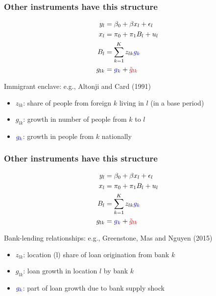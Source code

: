 \documentclass[notes,11pt, aspectratio=169]{beamer}
\begin{document}


\begin{frame}
\addtocounter{framenumber}{-1}
\frametitle{Other instruments have this structure}

\begin{align}
  y_l&= \beta_0 + \beta x_l + \epsilon_l \notag \\
  x_l&= \pi_0 + \pi_{1} B_l + u_l \notag \\  
B_l &=  \sum_{k=1}^{K}z_{lk} \textcolor{blue}{g_{k}} \notag \\
g_{lk} &=   \textcolor{blue}{g}_{ \textcolor{blue}{k}}+  \textcolor{red}{\tilde{g}_{lk}}  \notag 
\end{align}

Immigrant enclave: e.g., Altonji and Card (1991)
\begin{itemize}
\item $z_{lk}$: share of people from foreign $k$ living in $l$ (in a base period)
\item $g_{lk}$:  growth in number of people from $k$ to $l$
\item $\textcolor{blue}{g_k}$: growth in people from $k$ nationally
\end{itemize}


\end{frame}


\begin{frame}
\addtocounter{framenumber}{-1}
\frametitle{Other instruments have this structure}

\begin{align}
  y_l&= \beta_0 + \beta x_l + \epsilon_l \notag \\
  x_l&= \pi_0 + \pi_{1} B_l + u_l \notag \\  
B_l &=  \sum_{k=1}^{K}z_{lk} \textcolor{blue}{g_{k}} \notag \\
g_{lk} &=   \textcolor{blue}{g}_{ \textcolor{blue}{k}}+  \textcolor{red}{\tilde{g}_{lk}}  \notag 
\end{align}

Bank-lending relationships: e.g., Greenstone, Mas and Nguyen (2015)
\begin{itemize}
\item $z_{lk}$: location (l) share of loan origination from bank $k$
\item $g_{lk}$:  loan growth in location $l$ by bank $k$
\item $\textcolor{blue}{g_k}$: part of loan growth due to bank supply shock
\end{itemize}


\end{frame}
\end{document}
